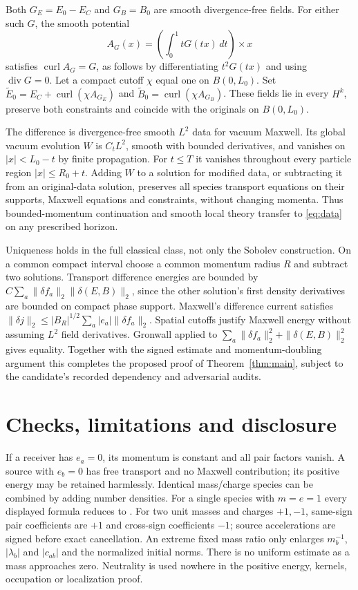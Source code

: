 \documentclass[11pt]{article}
\newcommand{\diver}{\operatorname{div}}
\newcommand{\curl}{\operatorname{curl}}
\theoremstyle{remark}\newtheorem{remark}[theorem]{Remark}
\numberwithin{equation}{section}
\begin{document}
Both $G_E=E_0-E_C$ and $G_B=B_0$ are smooth divergence-free fields.
For either such $G$, the smooth potential
\[
 A_G(x)=\left(\int_0^1 tG(tx)\,dt\right)\times x
\]
satisfies $\curl A_G=G$, as follows by differentiating $t^2G(tx)$ and
using $\diver G=0$. Let a compact cutoff $\chi$ equal one on $B(0,L_0)$.
Set $\widetilde E_0=E_C+\curl(\chi A_{G_E})$ and
$\widetilde B_0=\curl(\chi A_{G_B})$.
These fields lie in every $H^k$, preserve both constraints and coincide
with the originals on $B(0,L_0)$.

The difference is divergence-free smooth $L^2$ data for vacuum Maxwell.
Its global vacuum evolution $W$ is $C_tL^2$, smooth with bounded derivatives,
and vanishes on $|x|<L_0-t$ by finite propagation. For $t\le T$ it
vanishes throughout every particle region $|x|\le R_0+t$.
Adding $W$ to a solution for modified data, or subtracting it from an
original-data solution, preserves all species transport equations on
their supports, Maxwell equations and constraints, without changing
momenta. Thus bounded-momentum continuation and smooth local theory
transfer to \eqref{eq:data} on any prescribed horizon.

Uniqueness holds in the full classical class, not only the Sobolev construction.
On a common compact interval choose a common momentum radius $R$ and
subtract two solutions. Transport difference energies are bounded by
$C\sum_a\|\delta f_a\|_2\|\delta(E,B)\|_2$, since the other solution's
first density derivatives are bounded on compact phase support. Maxwell's
difference current satisfies
$\|\delta j\|_2\le|B_R|^{1/2}\sum_a|e_a|\|\delta f_a\|_2$.
Spatial cutoffs justify Maxwell energy without assuming $L^2$ field
derivatives. Gronwall applied to
$\sum_a\|\delta f_a\|_2^2+\|\delta(E,B)\|_2^2$ gives equality.
Together with the signed estimate and momentum-doubling argument this
completes the proposed proof of Theorem~\ref{thm:main}, subject to the
candidate's recorded dependency and adversarial audits.

\section{Checks, limitations and disclosure}
If a receiver has $e_a=0$, its momentum is constant and all pair factors
vanish. A source with $e_b=0$ has free transport and no Maxwell contribution;
its positive energy may be retained harmlessly. Identical mass/charge species
can be combined by adding number densities. For a single species with
$m=e=1$ every displayed formula reduces to \cite{OAI362}.
For two unit masses and charges $+1,-1$, same-sign pair coefficients are
$+1$ and cross-sign coefficients $-1$; source accelerations are signed
before exact cancellation. An extreme fixed mass ratio only enlarges
$m_b^{-1}$, $|\lambda_b|$ and $|c_{ab}|$ and the normalized initial norms.
There is no uniform estimate as a mass approaches zero. Neutrality is used
nowhere in the positive energy, kernels, occupation or localization proof.
\end{document}
